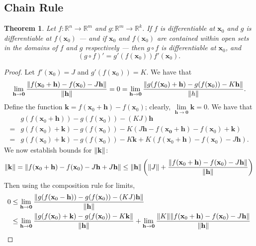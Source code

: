 \documentclass[11pt]{article}
\newtheorem*{theorem*}{Theorem}
\renewcommand{\vec}[1]{\mathbf{#1}}
\begin{document}
\subsection{Chain Rule}

\begin{adjustwidth}{1cm}{}
	\begin{theorem*}
		Let $f : \mathbb{R}^{n} \to \mathbb{R}^{m}$ and $g : \mathbb{R}^{m} \to \mathbb{R}^{k}$. If $f$ is differentiable at $\vec{x}_{0}$ and $g$ is differentiable at $f(\vec{x}_{0})$ --- and if $\vec{x}_{0}$ and $f(\vec{x}_{0})$ are contained within open sets in the domains of $f$ and $g$ respectively --- then $g \circ f$ is differentiable at $\vec{x}_{0}$, and
		\[
			(g \circ f)' = g'(f(\vec{x}_{0})) f'(\vec{x}_{0}).
		\]
	\end{theorem*}
    \begin{proof}\renewcommand{\qedsymbol}{}
		Let $f'(\vec{x}_{0}) = J$ and $g'(f(\vec{x}_{0})) = K$. We have that
		\[
		\lim\limits_{\vec{h} \to \vec{0}} \frac{\norm{f(\vec{x}_{0} + \vec{h}) - f(\vec{x}_{0}) - J \vec{h}}}{\norm{\vec{h}}} = 0 = \lim\limits_{\vec{h} \to \vec{0}} \frac{\norm{g(f(\vec{x}_{0}) + \vec{h}) - g(f(\vec{x}_{0})) - K \vec{h}}}{\norm{h}}.
		\]
		Define the function $\vec{k} = f(\vec{x}_{0} + \vec{h}) - f(\vec{x}_{0})$; clearly, $\lim\limits_{\vec{h} \to \vec{0}} \vec{k} = 0$. We have that
		\begin{align*}
			& g(f(\vec{x}_{0} + \vec{h})) - g(f(\vec{x}_{0})) - (KJ) \vec{h} \\
			=& g(f(\vec{x}_{0}) + \vec{k}) - g(f(\vec{x}_{0})) - K(J \vec{h} - f(\vec{x_{0} + \vec{h}}) - f(\vec{x}_{0}) + \vec{k}) \\
			=& g(f(\vec{x}_{0}) + \vec{k}) - g(f(\vec{x}_{0})) - K \vec{k} + K(f(\vec{x}_{0} + \vec{h}) - f(\vec{x}_{0}) - J \vec{h}).
		\end{align*}
		We now establish bounds for $\norm{\vec{k}}$: 
		\[
			\norm{\vec{k}} = \norm{f(\vec{x}_{0} + \vec{h}) - f(\vec{x}_{0}) - J \vec{h} + J \vec{h}} \le \norm{\vec{h}} \left(\norm{J} + \frac{\norm{f(\vec{x}_{0} + \vec{h}) - f(\vec{x}_{0}) - J \vec{h}}}{\norm{\vec{h}}}\right)
		\]
		Then using the composition rule for limits,
		\begin{align*}
			0 &\le \lim\limits_{\vec{h} \to \vec{0}} \frac{\norm{g(f(\vec{x}_{0} - \vec{h})) - g(f(\vec{x}_{0})) - (KJ) \vec{h}}}{\norm{\vec{h}}} \\
			&\le \lim\limits_{\vec{h} \to \vec{0}} \frac{\norm{g(f(\vec{x}_{0}) + \vec{k}) - g(f(\vec{x}_{0})) - K \vec{k}}}{\norm{\vec{h}}} + \lim\limits_{\vec{h} \to \vec{0}} \frac{\norm{K}\norm{f(\vec{x}_{0} + \vec{h}) - f(\vec{x}_{0}) - J \vec{h}}}{\norm{\vec{h}}} \\

\end{align*}
\end{proof}
\end{adjustwidth}
\end{document}
